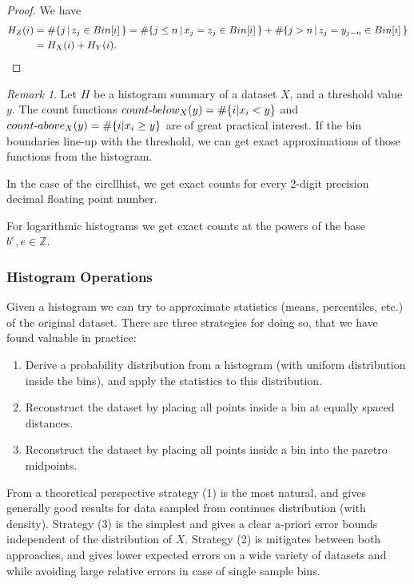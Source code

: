 \documentclass{article}
\theoremstyle{plain}
\theoremstyle{remark}
\newtheorem{remark}[definition]{Remark}
\newcommand{\IZ}{\mathbb{Z}}
\begin{document}
\begin{proof}
  We have
  \begin{align*}
    H_Z(i) &= \# \{ j \, | \, z_j \in Bin[i] \, \} =
    \# \{ j \leq n \, | \, x_j = z_j \in Bin[i] \, \} +
    \# \{ j > n \, | \, z_j = y_{j-n} \in Bin[i] \, \} \\
    &= H_X(i) + H_Y(i). \qedhere
  \end{align*}
\end{proof}

\def\hyph{{\hbox{-}}}

\begin{remark}
  Let $H$ be a histogram summary of a dataset $X$, and a threshold value $y$.  The count functions
  $count\hyph below_X(y) = \#\{ i | x_i < y \}$ and $count\hyph above_X(y) = \#\{ i | x_i \geq y \}$
  are of great practical interest. If the bin boundaries line-up with the threshold, we can
  get exact approximations of those functions from the histogram.

  In the case of the circllhist, we get exact counts for every 2-digit precision decimal floating point number.

  For logarithmic histograms we get exact counts at the powers of the base $b^e, e\in \IZ$.
\end{remark}

\subsubsection{Histogram Operations}

Given a histogram we can try to approximate statistics (means, percentiles, etc.) of the original dataset.
There are three strategies for doing so, that we have found valuable in practice:

\begin{enumerate}
\item Derive a probability distribution from a histogram (with uniform distribution inside the
  bins), and apply the statistics to this distribution.
\item Reconstruct the dataset by placing all points inside a bin at equally spaced distances.
\item Reconstruct the dataset by placing all points inside a bin into the paretro midpoints.
\end{enumerate}

From a theoretical perspective strategy (1) is the most natural, and gives generally good results
for data sampled from continues distribution (with density).
Strategy (3) is the simplest and gives a clear a-priori error bounds independent of the distribution of $X$.
Strategy (2) is mitigates between both approaches, and gives lower expected errors on a wide variety of
datasets and while avoiding large relative errors in case of single sample bins.
\end{document}
